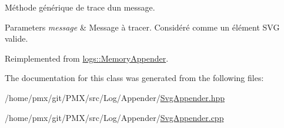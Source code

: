 Méthode générique de trace d\textquotesingle{}un message. 


\begin{DoxyParams}{Parameters}
{\em message} & Message à tracer. Considéré comme un élément S\+VG valide. \\
\hline
\end{DoxyParams}


Reimplemented from \hyperlink{classlogs_1_1MemoryAppender_a478c866b07f63f1f89c347b4465834bc}{logs\+::\+Memory\+Appender}.



The documentation for this class was generated from the following files\+:\begin{DoxyCompactItemize}
\item 
/home/pmx/git/\+P\+M\+X/src/\+Log/\+Appender/\hyperlink{SvgAppender_8hpp}{Svg\+Appender.\+hpp}\item 
/home/pmx/git/\+P\+M\+X/src/\+Log/\+Appender/\hyperlink{SvgAppender_8cpp}{Svg\+Appender.\+cpp}\end{DoxyCompactItemize}
